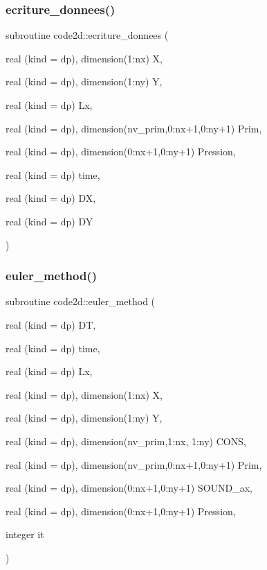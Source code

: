 \mbox{\label{mainSW_8f90_a71aecccc646b5e5547884fff4f3a4320}} 
\subsubsection{\texorpdfstring{ecriture\+\_\+donnees()}{ecriture\_donnees()}}
{\footnotesize\ttfamily subroutine code2d\+::ecriture\+\_\+donnees (\begin{DoxyParamCaption}\item[{real (kind = dp), dimension(1\+:nx)}]{X,  }\item[{real (kind = dp), dimension(1\+:ny)}]{Y,  }\item[{real (kind = dp)}]{Lx,  }\item[{real (kind = dp), dimension(nv\+\_\+prim,0\+:nx+1,0\+:ny+1)}]{Prim,  }\item[{real (kind = dp), dimension(0\+:nx+1,0\+:ny+1)}]{Pression,  }\item[{real (kind = dp)}]{time,  }\item[{real (kind = dp)}]{DX,  }\item[{real (kind = dp)}]{DY }\end{DoxyParamCaption})}

\mbox{\label{mainSW_8f90_ac38992b213d7b23accbdf96615349ef0}} 
\subsubsection{\texorpdfstring{euler\+\_\+method()}{euler\_method()}}
{\footnotesize\ttfamily subroutine code2d\+::euler\+\_\+method (\begin{DoxyParamCaption}\item[{real (kind = dp)}]{DT,  }\item[{real (kind = dp)}]{time,  }\item[{real (kind = dp)}]{Lx,  }\item[{real (kind = dp), dimension(1\+:nx)}]{X,  }\item[{real (kind = dp), dimension(1\+:ny)}]{Y,  }\item[{real (kind = dp), dimension(nv\+\_\+prim,1\+:nx, 1\+:ny)}]{C\+O\+NS,  }\item[{real (kind = dp), dimension(nv\+\_\+prim,0\+:nx+1,0\+:ny+1)}]{Prim,  }\item[{real (kind = dp), dimension(0\+:nx+1,0\+:ny+1)}]{S\+O\+U\+N\+D\+\_\+ax,  }\item[{real (kind = dp), dimension(0\+:nx+1,0\+:ny+1)}]{Pression,  }\item[{integer}]{it }\end{DoxyParamCaption})}

